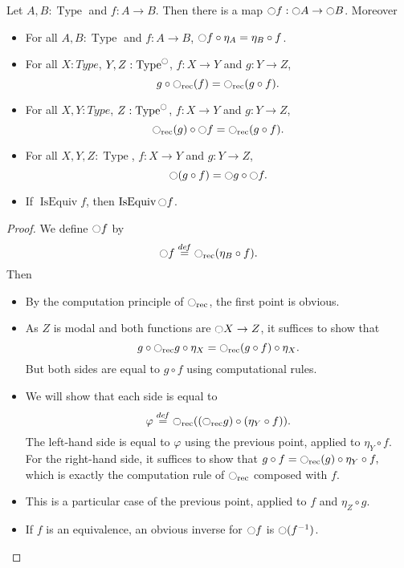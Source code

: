 \documentclass[notfinal]{jfrarticle}
\DeclareMathOperator{\Type}{Type}
\DeclareMathOperator{\IsEquiv}{IsEquiv}
\newcommand \defeq {\overset{de\hspace{-0.2ex}f}{=}}
\newcommand{\modal}{\ensuremath{\ocircle}}
\begin{document}
\begin{lem}
  Let $A,B:\Type$ and $f:A\to B$. Then there is a map $\modal f:\modal
  A \to \modal B$. Moreover
  \begin{itemize}
  \item For all $A,B:\Type$ and $f:A\to B$, $\modal f \circ \eta_A = \eta_B \circ f$.
  \item For all $X:Type$, $Y,Z:\Type^\modal$, $f:X\to Y$ and $g:Y\to
    Z$, 
    \[g \circ \modal_{\text{rec}}(f) = \modal_{\text{rec}} (g\circ
    f).\]
  \item For all $X,Y:Type$, $Z:\Type^\modal$, $f:X\to Y$ and $g:Y\to
    Z$, \[\modal_{\text{rec}}(g) \circ \modal f = \modal_{\text{rec}}
    (g\circ f).\]
  \item For all $X,Y,Z:\Type$, $f:X\to Y$ and $g:Y\to Z$, 
    \[\modal (g \circ f) = \modal g \circ \modal f.\]
  \item If $\IsEquiv f$, then $\IsEquiv \modal f$.
  \end{itemize}
\end{lem}
\begin{proof}
  We define $\modal f$ by
  \[ \modal f \defeq \modal_{\text{rec}}(\eta_B \circ f).\]
  Then
  \begin{itemize}
  \item By the computation principle of $\modal_{\text{rec}}$, the
    first point is obvious.
  \item As $Z$ is modal and both functions are $\modal X\to Z$, it suffices to show that 
    \[g \circ \modal_{\text{rec}} g \circ \eta_X = \modal_{\text{rec}} (g\circ
    f) \circ \eta_X.\]
    But both sides are equal to $g\circ f$ using computational rules.
  \item We will show that each side is equal to
    \[\varphi \defeq \modal_{\text{rec}} ((\modal_{\text{rec}} g) \circ (\eta_Y
    \circ f)).\]
    The left-hand side is equal to $\varphi$ using the previous point,
    applied to $\eta_Y \circ f$.
    For the right-hand side, it suffices to show that
    $g\circ f = \modal_{\text{rec}}(g) \circ \eta_Y \circ f,$
    which is exactly the computation rule of $\modal_{\text{rec}}$
    composed with $f$.
  \item This is a particular case of the previous point, applied to
    $f$ and $\eta_Z \circ g$.
  \item If $f$ is an equivalence, an obvious inverse for $\modal f$ is
    $\modal (f^{-1})$.

  \end{itemize}
\end{proof}
\end{document}
